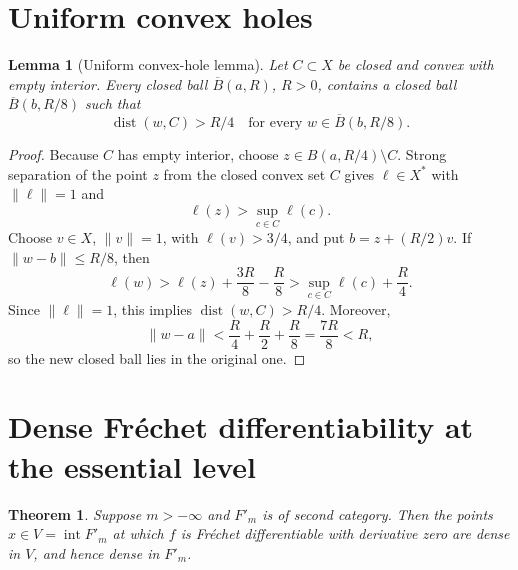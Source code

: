 \documentclass[11pt]{article}
\newtheorem{theorem}{Theorem}
\newtheorem{lemma}{Lemma}
\begin{document}
\section{Uniform convex holes}

\begin{lemma}[Uniform convex-hole lemma]\label{lem:hole}
Let \(C\subset X\) be closed and convex with empty interior. Every closed
ball \(\overline B(a,R)\), \(R>0\), contains a closed ball
\(\overline B(b,R/8)\) such that
\[
 \operatorname{dist}(w,C)>R/4
 \quad\text{for every }w\in\overline B(b,R/8).
\]
\end{lemma}

\begin{proof}
Because \(C\) has empty interior, choose
\(z\in B(a,R/4)\setminus C\). Strong separation of the point \(z\) from the
closed convex set \(C\) gives \(\ell\in X^*\) with \(\|\ell\|=1\) and
\[
 \ell(z)>\sup_{c\in C}\ell(c).
\]
Choose \(v\in X\), \(\|v\|=1\), with \(\ell(v)>3/4\), and put
\(b=z+(R/2)v\). If \(\|w-b\|\le R/8\), then
\[
 \ell(w)>\ell(z)+\frac{3R}{8}-\frac R8
 >\sup_{c\in C}\ell(c)+\frac R4.
\]
Since \(\|\ell\|=1\), this implies \(\operatorname{dist}(w,C)>R/4\).
Moreover,
\[
 \|w-a\|<\frac R4+\frac R2+\frac R8=\frac{7R}{8}<R,
\]
so the new closed ball lies in the original one.
\end{proof}

\section{Dense Fr\'echet differentiability at the essential level}

\begin{theorem}\label{thm:hard}
Suppose \(m>-\infty\) and \(F'_m\) is of second category. Then the points
\(x\in V=\operatorname{int}F'_m\) at which \(f\) is Fr\'echet differentiable
with derivative zero are dense in \(V\), and hence dense in \(F'_m\).
\end{theorem}
\end{document}
